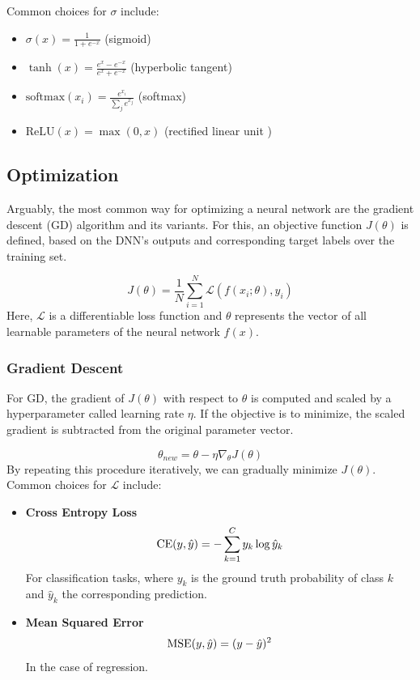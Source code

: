 Common choices for $\sigma$ include:

\begin{itemize}
    \item $\sigma(x) = \frac{1}{1 + e^{-x}}$ (sigmoid)
    \item $\tanh(x) = \frac{e^x - e^{-x}}{e^x + e^{-x}}$ (hyperbolic tangent)
    \item $\text{softmax}(x_i) = \frac{e^{x_i}}{\sum_j e^{x_j}}$ (softmax)
    \item $\text{ReLU}(x) = \max(0, x)$ (rectified linear unit \cite{nair2010rectified})
\end{itemize}

\subsection{Optimization}
Arguably, the most common way for optimizing a neural network are the gradient descent (GD) algorithm and its variants. For this, an objective function $J(\theta)$ is defined, based on the DNN's outputs and corresponding target labels over the training set.

\begin{equation}
    J(\theta) = \frac{1}{N} \sum_{i=1}^{N} \mathcal{L}(f(x_i; \theta), y_i)
\end{equation}
Here, $\mathcal{L}$ is a differentiable loss function and $\theta$ represents the vector of all learnable parameters of the neural network $f(x)$.

\subsubsection{Gradient Descent}
For GD, the gradient of $J(\theta)$ with respect to $\theta$ is computed and scaled by a hyperparameter called learning rate $\eta$. If the objective is to minimize, the scaled gradient is subtracted from the original parameter vector.

\begin{equation}
    \theta_{new} = \theta - \eta\nabla_\theta J(\theta)
\end{equation}
By repeating this procedure iteratively, we can gradually minimize $J(\theta)$. Common choices for $\mathcal{L}$ include:
\begin{itemize}
    \item \textbf{Cross Entropy Loss}
          \begin{equation}
              \label{eq:ce_loss}
              \text{CE}(y, \hat{y}) = - \sum_{k=1}^C y_k \log \hat{y}_k
          \end{equation}
          For classification tasks, where $y_k$ is the ground truth probability of class $k$ and $\hat{y}_k$ the corresponding prediction.

    \item \textbf{Mean Squared Error}
          \begin{equation}
              \text{MSE}(y, \hat{y}) = (y - \hat{y})^2
          \end{equation}
          In the case of regression.
\end{itemize}

